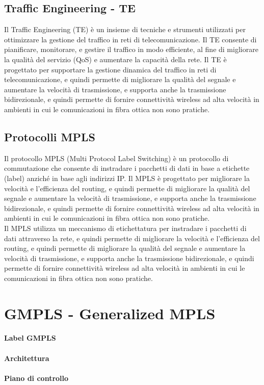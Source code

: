 \subsection{Traffic Engineering - TE}
Il Traffic Engineering (TE) è un insieme di tecniche e strumenti utilizzati per ottimizzare la gestione del traffico in reti di telecomunicazione. Il TE consente di pianificare, monitorare, e gestire il traffico in modo efficiente, al fine di migliorare la qualità del servizio (QoS) e aumentare la capacità della rete. Il TE è progettato per supportare la gestione dinamica del traffico in reti di telecomunicazione, e quindi permette di migliorare la qualità del segnale e aumentare la velocità di trasmissione, e supporta anche la trasmissione bidirezionale, e quindi permette di fornire connettività wireless ad alta velocità in ambienti in cui le comunicazioni in fibra ottica non sono pratiche.\\

\subsection{Protocolli MPLS}
Il protocollo MPLS (Multi Protocol Label Switching) è un protocollo di commutazione che consente di instradare i pacchetti di dati in base a etichette (label) anziché in base agli indirizzi IP. Il MPLS è progettato per migliorare la velocità e l'efficienza del routing, e quindi permette di migliorare la qualità del segnale e aumentare la velocità di trasmissione, e supporta anche la trasmissione bidirezionale, e quindi permette di fornire connettività wireless ad alta velocità in ambienti in cui le comunicazioni in fibra ottica non sono pratiche.\\
Il MPLS utilizza un meccanismo di etichettatura per instradare i pacchetti di dati attraverso la rete, e quindi permette di migliorare la velocità e l'efficienza del routing, e quindi permette di migliorare la qualità del segnale e aumentare la velocità di trasmissione, e supporta anche la trasmissione bidirezionale, e quindi permette di fornire connettività wireless ad alta velocità in ambienti in cui le comunicazioni in fibra ottica non sono pratiche.\\

\section{GMPLS - Generalized MPLS}
\paragraph{Label GMPLS}

\paragraph{Architettura}
\paragraph{Piano di controllo}